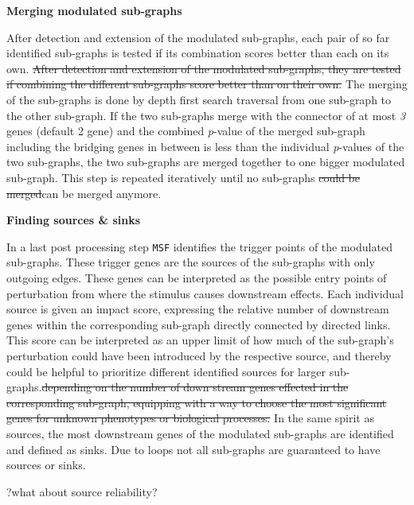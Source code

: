 \documentclass[10pt,a4paper,twocolumn]{article}
\newcommand{\FA}[1]{\begingroup\color{magenta}#1\endgroup}
\newcommand{\TODO}[1]{\begingroup\color{red}#1\endgroup}
\begin{document}
	\textbf{Merging modulated sub-graphs}

        \FA{After detection and extension of the modulated sub-graphs,
          each pair of so far identified sub-graphs is tested if its
          combination scores better than each on its own.}
        \sout{After detection and extension of the modulated
          sub-graphs, they are tested if combining the different
          sub-graphs score better than on their own.} The merging of
        the sub-graphs is done by depth first search traversal from
        one sub-graph to the other sub-graph. If the two sub-graphs
        merge with the connector of at most \emph{3} genes (default 2
        gene) and the combined \textit{p}-value of the merged
        sub-graph including the bridging genes in between is less than
        the individual \textit{p}-values of the two sub-graphs, the
        two sub-graphs are merged together to one big\FA{ger}
        modulated sub-graph. This step is repeated iteratively until
        no sub-graphs \sout{could be merged}\FA{can be merged
          anymore}.\newline
	
	\textbf{Finding sources \& sinks}
	
	In a last post processing step \texttt{MSF} identifies the
        trigger points of the modulated sub-graphs. These trigger
        genes are the sources of the sub-graphs with only outgoing
        edges. These genes can be interpreted as the possible entry
        points of perturbation from where the stimulus causes
        downstream effects. Each individual source is given an impact
        score, \FA{expressing the relative number of downstream genes
          within the corresponding sub-graph directly connected by
          directed links. This score can be interpreted as an upper
          limit of how much of the sub-graph's perturbation could have
          been introduced by the respective source, and thereby could
          be helpful to prioritize different identified sources for
          larger sub-graphs.}\sout{depending on the number of down
          stream genes effected in the corresponding sub-graph,
          equipping with a way to choose the most significant genes
          for unknown phenotypes or biological processes.} In the same
        spirit \FA{as sources}, the most downstream genes of the
        modulated sub-graphs are identified and defined as sinks. Due
        to loops not all sub-graphs are guaranteed to have sources or
        sinks.

        \TODO{?what about source reliability?}
	
\end{document}
